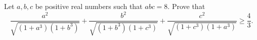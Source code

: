 Let $a, b, c$ be positive real numbers such that $abc=8$. Prove that \[\frac{a^2}{\sqrt{(1+a^3)(1+b^3)}} +\frac{b^2}{\sqrt{(1+b^3)(1+c^3)}} +\frac{c^2}{\sqrt{(1+c^3)(1+a^3)}} \geq \frac{4}{3}.\]